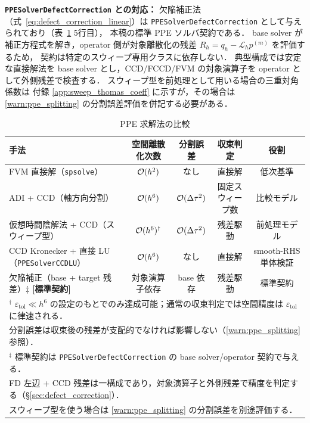 \textbf{\texttt{PPESolverDefectCorrection} との対応：}
欠陥補正法（式~\eqref{eq:defect_correction_linear}）は
\texttt{PPESolverDefectCorrection} として与えられており（表~\ref{tab:ppe_methods} 5行目），
本稿の標準 PPE ソルバ契約である．
base solver が補正方程式を解き，operator 側が対象離散化の残差
$R_h = q_h-\mathcal{L}_h p^{(m)}$ を評価するため，
契約は特定のスウィープ専用クラスに依存しない．
典型構成では安定な直接解法を base solver とし，CCD/FCCD/FVM の対象演算子を
operator として外側残差で検査する．
スウィープ型を前処理として用いる場合の三重対角係数は
付録 \ref{app:sweep_thomas_coeff} に示すが，その場合は
\ref{warn:ppe_splitting} の分割誤差評価を併記する必要がある．

\begin{table}[htbp]
\centering
\caption{PPE 求解法の比較}
\label{tab:ppe_methods}
\PaperTableDenseSetup
\begin{tabular}{lcccc}
\hline
手法 & 空間離散化次数 & 分割誤差 & 収束判定 & 役割 \\
\hline
FVM 直接解（\texttt{spsolve}） & $\mathcal{O}(h^2)$ & なし & 直接解 & 低次基準 \\
ADI + CCD（軸方向分割） & $\mathcal{O}(h^6)$ & $\mathcal{O}(\Delta\tau^2)$ & 固定スウィープ数 & 比較モデル \\
仮想時間陰解法 + CCD（スウィープ型）& $\mathcal{O}(h^6)^{\dagger}$ & $\mathcal{O}(\Delta\tau^2)$ & 残差駆動 & 前処理モデル \\
CCD Kronecker + 直接 LU（\texttt{PPESolverCCDLU}） & $\mathcal{O}(h^6)$ & なし & 直接解 & smooth-RHS 単体検証 \\
欠陥補正（base + target 残差）$\ddagger$ \textbf{[標準契約]} & 対象演算子依存 & base 依存 & 残差駆動 & 標準契約 \\
\hline
\multicolumn{5}{l}{$^{\dagger}$ $\varepsilon_\mathrm{tol} \ll h^6$ の設定のもとでのみ達成可能；通常の収束判定では空間精度は $\varepsilon_\mathrm{tol}$ に律速される．}\\
\multicolumn{5}{l}{\phantom{$^{\dagger}$} 分割誤差は収束後の残差が支配的でなければ影響しない（\ref{warn:ppe_splitting} 参照）．}\\
\multicolumn{5}{l}{$^{\ddagger}$ 標準契約は \texttt{PPESolverDefectCorrection} の base solver/operator 契約で与える．}\\
\multicolumn{5}{l}{\phantom{$^{\ddagger}$} FD 左辺 + CCD 残差は一構成であり，対象演算子と外側残差で精度を判定する（§\ref{sec:defect_correction}）．}\\
\multicolumn{5}{l}{\phantom{$^{\ddagger}$} スウィープ型を使う場合は \ref{warn:ppe_splitting} の分割誤差を別途評価する．}
\end{tabular}
\end{table}

